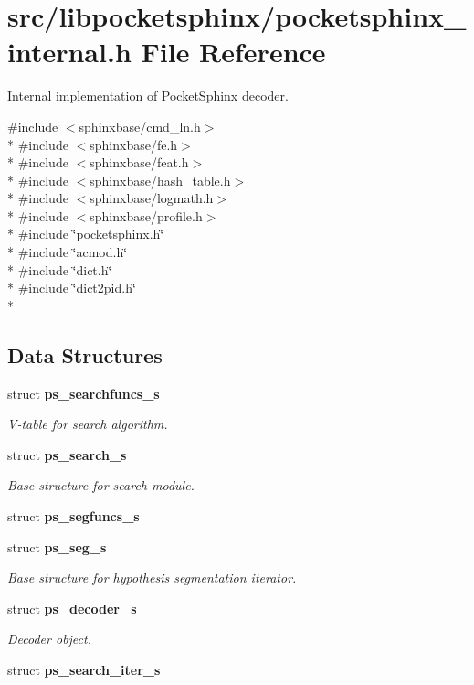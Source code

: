 \section{src/libpocketsphinx/pocketsphinx\-\_\-internal.h File Reference}
\label{pocketsphinx__internal_8h}


Internal implementation of Pocket\-Sphinx decoder.  


{\ttfamily \#include $<$sphinxbase/cmd\-\_\-ln.\-h$>$}\\*
{\ttfamily \#include $<$sphinxbase/fe.\-h$>$}\\*
{\ttfamily \#include $<$sphinxbase/feat.\-h$>$}\\*
{\ttfamily \#include $<$sphinxbase/hash\-\_\-table.\-h$>$}\\*
{\ttfamily \#include $<$sphinxbase/logmath.\-h$>$}\\*
{\ttfamily \#include $<$sphinxbase/profile.\-h$>$}\\*
{\ttfamily \#include \char`\"{}pocketsphinx.\-h\char`\"{}}\\*
{\ttfamily \#include \char`\"{}acmod.\-h\char`\"{}}\\*
{\ttfamily \#include \char`\"{}dict.\-h\char`\"{}}\\*
{\ttfamily \#include \char`\"{}dict2pid.\-h\char`\"{}}\\*
\subsection*{Data Structures}
\begin{DoxyCompactItemize}
\item 
struct {\bf ps\-\_\-searchfuncs\-\_\-s}
\begin{DoxyCompactList}\small\item\em V-\/table for search algorithm. \end{DoxyCompactList}\item 
struct {\bf ps\-\_\-search\-\_\-s}
\begin{DoxyCompactList}\small\item\em Base structure for search module. \end{DoxyCompactList}\item 
struct {\bf ps\-\_\-segfuncs\-\_\-s}
\item 
struct {\bf ps\-\_\-seg\-\_\-s}
\begin{DoxyCompactList}\small\item\em Base structure for hypothesis segmentation iterator. \end{DoxyCompactList}\item 
struct {\bf ps\-\_\-decoder\-\_\-s}
\begin{DoxyCompactList}\small\item\em Decoder object. \end{DoxyCompactList}\item 
struct {\bf ps\-\_\-search\-\_\-iter\-\_\-s}
\end{DoxyCompactItemize}
